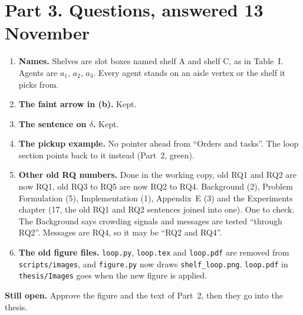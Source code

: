 \documentclass[11pt,a4paper]{article}
\begin{document}
\section*{Part 3. Questions, answered 13 November}
\begin{enumerate}[leftmargin=1.4em]
\item \textbf{Names.} Shelves are slot boxes named shelf A and shelf C, as in
  Table~I. Agents are $a_1$, $a_2$, $a_3$. Every agent stands on an aisle
  vertex or the shelf it picks from.
\item \textbf{The faint arrow in (b).} Kept.
\item \textbf{The sentence on $\delta$.} Kept.
\item \textbf{The pickup example.} No pointer ahead from ``Orders and tasks''.
  The loop section points back to it instead (Part~2, green).
\item \textbf{Other old RQ numbers.} Done in the working copy, old RQ1 and RQ2
  are now RQ1, old RQ3 to RQ5 are now RQ2 to RQ4. Background (2), Problem
  Formulation (5), Implementation (1), Appendix~E (3) and the Experiments
  chapter (17, the old RQ1 and RQ2 sentences joined into one). One to check.
  The Background says crowding signals and messages are tested ``through RQ2''.
  Messages are RQ4, so it may be ``RQ2 and RQ4''.
\item \textbf{The old figure files.} \texttt{loop.py}, \texttt{loop.tex} and
  \texttt{loop.pdf} are removed from \texttt{scripts/images}, and
  \texttt{figure.py} now draws \texttt{shelf\_loop.png}. \texttt{loop.pdf} in
  \texttt{thesis/Images} goes when the new figure is applied.
\end{enumerate}

\textbf{Still open.} Approve the figure and the text of Part~2, then they go into
the thesis.
\end{document}
